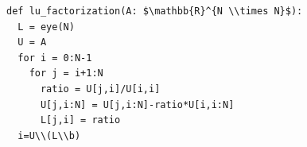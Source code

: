 \documentclass[border=10pt]{standalone}
\begin{document}
\begin{lstlisting}
def lu_factorization(A: $\mathbb{R}^{N \\times N}$):
  L = eye(N)
  U = A
  for i = 0:N-1
    for j = i+1:N
      ratio = U[j,i]/U[i,i]
      U[j,i:N] = U[j,i:N]-ratio*U[i,i:N]
      L[j,i] = ratio
  i=U\\(L\\b)
\end{lstlisting}
\end{document}
